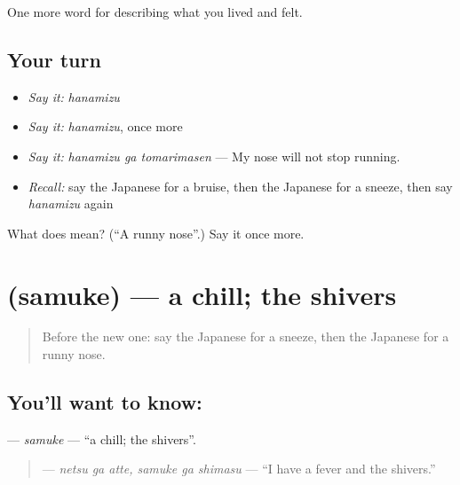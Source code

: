 \begin{grammarlens}[title={What you've built}]
One more word for describing what you lived and felt.
\end{grammarlens}

\subsection*{Your turn}
\begin{itemize}
\raggedright
  \item \emph{Say it:} \emph{hanamizu}
  \item \emph{Say it:} \emph{hanamizu}, once more
  \item \emph{Say it:} \emph{hanamizu ga tomarimasen} — My nose will not stop running.
  \item \emph{Recall:} say the Japanese for a bruise, then the Japanese for a sneeze, then say \emph{hanamizu} again
\end{itemize}

\begin{tcolorbox}[breakable,colback=teal!4,colframe=teal!35!black,title={Before you move on}]
What does  mean? (\textquotedblleft{}A runny nose\textquotedblright{}.) Say it once more.
\end{tcolorbox}
\section[\texorpdfstring{\ja{さむけ} (samuke)}{さむけ (samuke)}]{ (samuke) — a chill; the shivers}

\label{lesson:JA-C446-samuke}



\begin{quote}
Before the new one: say the Japanese for a sneeze, then the Japanese for a runny nose.
\end{quote}

\subsection*{You'll want to know: }
\textbf{} — \emph{samuke} — \textquotedblleft{}a chill; the shivers\textquotedblright{}.

\begin{quote}
\textbf{  } — \emph{netsu ga atte, samuke ga shimasu} — \textquotedblleft{}I have a fever and the shivers.\textquotedblright{}
\end{quote}

